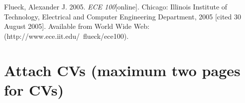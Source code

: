 \documentclass[a4paper, 11pt]{article}
\begin{document}
\begin{footnotesize}
\begin{thebibliography}{11}


   Flueck, Alexander J. 2005. \emph{ECE 100}[online]. Chicago: Illinois Institute of Technology, Electrical and Computer Engineering Department, 2005 [cited 30 August 2005]. Available from World Wide Web: (http://www.ece.iit.edu/~flueck/ece100).

\end{thebibliography}

\end{footnotesize}


	
	
	\section{Attach CVs (maximum two pages for CVs)}
	
\end{document}
